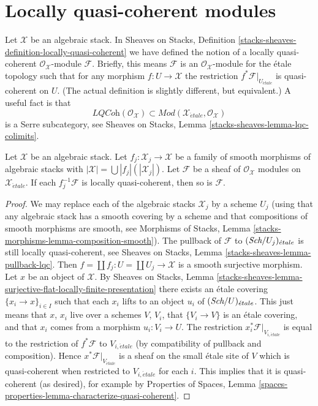\section{Locally quasi-coherent modules}
\label{section-locally-quasi-coherent}

\noindent
Let $\mathcal{X}$ be an algebraic stack. In
Sheaves on Stacks, Definition
\ref{stacks-sheaves-definition-locally-quasi-coherent}
we have defined the notion of a locally quasi-coherent
$\mathcal{O}_\mathcal{X}$-module $\mathcal{F}$. Briefly, this means
$\mathcal{F}$ is an $\mathcal{O}_\mathcal{X}$-module for the
\'etale topology such that for any morphism $f : U \to \mathcal{X}$
the restriction $f^*\mathcal{F}|_{U_{\acute{e}tale}}$ is quasi-coherent
on $U$. (The actual definition is slightly different, but equivalent.)
A useful fact is that
$$
\textit{LQCoh}(\mathcal{O}_\mathcal{X}) \subset
\textit{Mod}(\mathcal{X}_{\acute{e}tale}, \mathcal{O}_\mathcal{X})
$$
is a Serre subcategory, see
Sheaves on Stacks, Lemma \ref{stacks-sheaves-lemma-lqc-colimits}.

\begin{lemma}
\label{lemma-check-lqc-on-etale-covering}
Let $\mathcal{X}$ be an algebraic stack. Let
$f_j : \mathcal{X}_j \to \mathcal{X}$ be a family of smooth
morphisms of algebraic stacks with
$|\mathcal{X}| =\bigcup |f_j|(|\mathcal{X}_j|)$.
Let $\mathcal{F}$ be a sheaf of $\mathcal{O}_\mathcal{X}$ modules
on $\mathcal{X}_{\acute{e}tale}$. If each $f_j^{-1}\mathcal{F}$
is locally quasi-coherent, then so is $\mathcal{F}$.
\end{lemma}

\begin{proof}
We may replace each of the algebraic stacks $\mathcal{X}_j$ by
a scheme $U_j$ (using that any algebraic stack has a smooth covering by
a scheme and that compositions of smooth morphisms are smooth, see
Morphisms of Stacks, Lemma \ref{stacks-morphisms-lemma-composition-smooth}).
The pullback of $\mathcal{F}$ to $(\textit{Sch}/U_j)_{\acute{e}tale}$ is still
locally quasi-coherent, see
Sheaves on Stacks, Lemma \ref{stacks-sheaves-lemma-pullback-lqc}.
Then $f = \coprod f_j : U = \coprod U_j \to \mathcal{X}$ is a smooth surjective
morphism. Let $x$ be an object of $\mathcal{X}$. By
Sheaves on Stacks, Lemma
\ref{stacks-sheaves-lemma-surjective-flat-locally-finite-presentation}
there exists an \'etale covering $\{x_i \to x\}_{i \in I}$
such that each $x_i$ lifts to an object $u_i$ of $(\textit{Sch}/U)_{\acute{e}tale}$.
This just means that $x$, $x_i$ live over a schemes $V$, $V_i$, that
$\{V_i \to V\}$ is an \'etale covering, and that $x_i$ comes from
a morphism $u_i : V_i \to U$. The restriction
$x_i^*\mathcal{F}|_{V_{i, \acute{e}tale}}$ is equal to the restriction
of $f^*\mathcal{F}$ to $V_{i, \acute{e}tale}$ (by compatibility of
pullback and composition). Hence $x^*\mathcal{F}|_{V_{\acute{e}tale}}$
is a sheaf on the small \'etale site of $V$ which is quasi-coherent
when restricted to $V_{i, \acute{e}tale}$ for each $i$.
This implies that it is quasi-coherent (as desired), for example by
Properties of Spaces, Lemma
\ref{spaces-properties-lemma-characterize-quasi-coherent}.
\end{proof}

